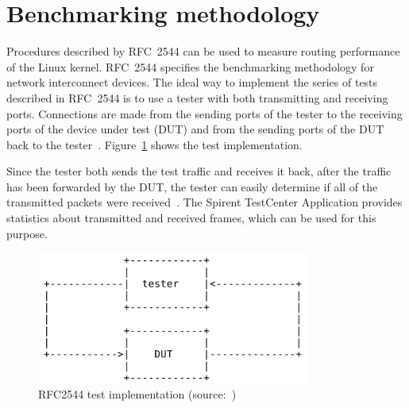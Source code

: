 
\section{Benchmarking methodology}\label{sec:analysis-metodology}
Procedures described by RFC~2544 can be used to measure routing performance of the Linux kernel.
RFC~2544 specifies the benchmarking methodology for network interconnect devices.
The ideal way to implement the series of tests described in RFC~2544 is to use a tester
with both transmitting and receiving ports.
Connections are made from the sending ports of the tester to the receiving ports of the
device under test (DUT) and from the sending ports of the DUT back to the tester~\cite{rfc2544}.
Figure~\ref{fig:analysis-rfc2544} shows the test implementation.

Since the tester both sends the test traffic and receives
it back, after the traffic has been forwarded by the DUT, the tester
can easily determine if all of the transmitted packets were received~\cite{rfc2544}.
The Spirent TestCenter Application provides statistics about transmitted and received frames,
which can be used for this purpose.
\begin{figure}
	\centering
	\includegraphics[width=9cm,keepaspectratio]{fig/rfc2544.png}
	\caption{RFC2544 test implementation (source:~\cite{rfc2544})}
	\label{fig:analysis-rfc2544}
\end{figure}




